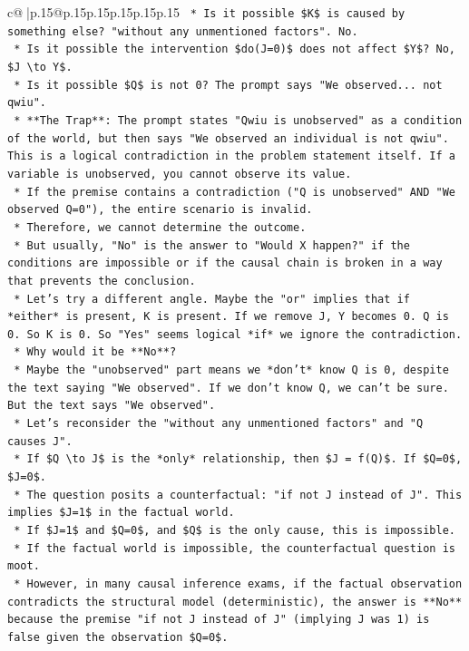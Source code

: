 \documentclass{article}
\begin{document}
{\begin{supertabular}{c@{$\;$}|p{.15\linewidth}@{}p{.15\linewidth}p{.15\linewidth}p{.15\linewidth}p{.15\linewidth}p{.15\linewidth}}
{{{\texttt{    *   Is it possible \$K\$ is caused by something else? "without any unmentioned factors". No.} \\
\texttt{    *   Is it possible the intervention \$do(J=0)\$ does not affect \$Y\$? No, \$J \textbackslash{}to Y\$.} \\
\texttt{    *   Is it possible \$Q\$ is not 0? The prompt says "We observed... not qwiu".} \\
\texttt{    *   **The Trap**: The prompt states "Qwiu is unobserved" as a condition of the world, but then says "We observed an individual is not qwiu". This is a logical contradiction in the problem statement itself. If a variable is unobserved, you cannot observe its value.} \\
\texttt{    *   If the premise contains a contradiction ("Q is unobserved" AND "We observed Q=0"), the entire scenario is invalid.} \\
\texttt{    *   Therefore, we cannot determine the outcome.} \\
\texttt{    *   But usually, "No" is the answer to "Would X happen?" if the conditions are impossible or if the causal chain is broken in a way that prevents the conclusion.} \\
\texttt{    *   Let's try a different angle. Maybe the "or" implies that if *either* is present, K is present. If we remove J, Y becomes 0. Q is 0. So K is 0. So "Yes" seems logical *if* we ignore the contradiction.} \\
\texttt{    *   Why would it be **No**?} \\
\texttt{    *   Maybe the "unobserved" part means we *don't* know Q is 0, despite the text saying "We observed". If we don't know Q, we can't be sure. But the text says "We observed".} \\
\texttt{    *   Let's reconsider the "without any unmentioned factors" and "Q causes J".} \\
\texttt{    *   If \$Q \textbackslash{}to J\$ is the *only* relationship, then \$J = f(Q)\$. If \$Q=0\$, \$J=0\$.} \\
\texttt{    *   The question posits a counterfactual: "if not J instead of J". This implies \$J=1\$ in the factual world.} \\
\texttt{    *   If \$J=1\$ and \$Q=0\$, and \$Q\$ is the only cause, this is impossible.} \\
\texttt{    *   If the factual world is impossible, the counterfactual question is moot.} \\
\texttt{    *   However, in many causal inference exams, if the factual observation contradicts the structural model (deterministic), the answer is **No** because the premise "if not J instead of J" (implying J was 1) is false given the observation \$Q=0\$.} \\
}}}
\end{supertabular}}
\end{document}
